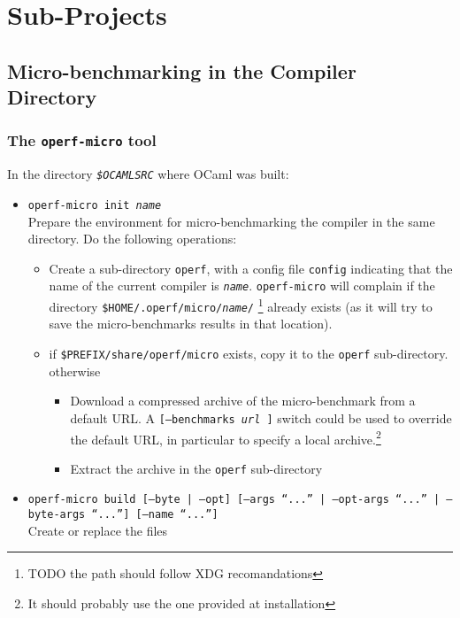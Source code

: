 \documentclass[11pt,a4paper]{article}
\begin{document}
\section{Sub-Projects}

\subsection{Micro-benchmarking in the Compiler Directory}

\subsubsection{The {\tt operf-micro} tool}

In the directory {\tt\em \$OCAMLSRC} where OCaml was built:
\begin{itemize}
\item {\tt operf-micro init {\em name}}\\ Prepare the environment
  for micro-benchmarking the compiler in the same directory.
  Do the following operations:
  \begin{itemize}
  \item Create a sub-directory {\tt operf}, with a config file {\tt config}
  indicating that the name of the current compiler is {\tt\em name}.
  {\tt operf-micro} will complain if the directory
  {\tt \$HOME/.operf/micro/{\em name}/} \footnote{TODO the path should
    follow XDG recomandations} already exists (as it will try to
  save the micro-benchmarks results in that location).
  \item
    if {\tt \$PREFIX/share/operf/micro} exists, copy it to the
    {\tt operf} sub-directory.\\
    otherwise
    \begin{itemize}
    \item Download a compressed archive of the micro-benchmark from a
      default URL. A {\tt [--benchmarks {\em url} ]} switch could be
      used to override the default URL, in particular to specify a
      local archive.\footnote{It should probably use the one provided
        at installation}
    \item Extract the archive in the {\tt operf} sub-directory
    \end{itemize}
  \end{itemize}
\item {\tt operf-micro build [--byte | --opt] [--args ``...'' | --opt-args ``...'' | --byte-args ``...''] [--name ``...'']}\\
  Create or replace the files

\end{itemize}
\end{document}
